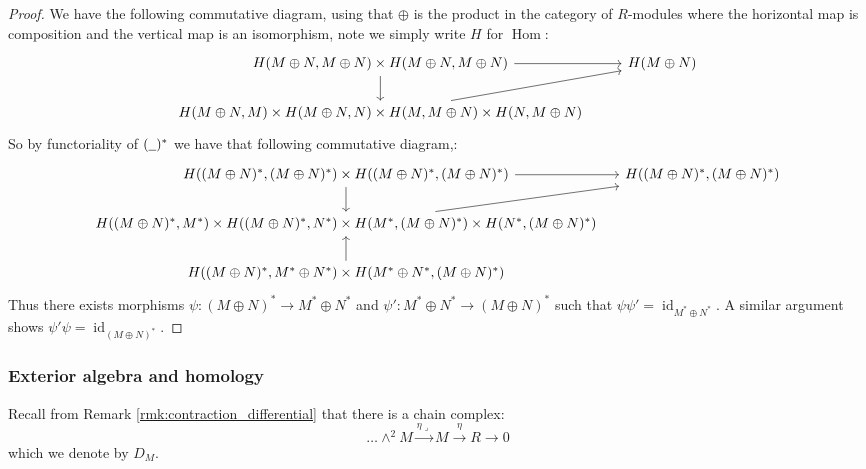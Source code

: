 \documentclass[12pt]{article}
\theoremstyle{plain}
\theoremstyle{definition}
\newcommand{\und}[1]{\underline{\hspace{#1 cm}}}
\newcommand{\lto}{\longrightarrow}
\begin{document}
\begin{proof}
We have the following commutative diagram, using that $\oplus$ is the product in the category of $R$-modules where the horizontal map is composition and the vertical map is an isomorphism, note we simply write $H$ for $\operatorname{Hom}$:
\begin{equation}
\begin{tikzcd}
H(M \oplus N, M \oplus N) \times H(M \oplus N, M \oplus N)\arrow[r]\arrow[d] & H(M \oplus N)\\
H(M \oplus N, M) \times H(M \oplus N, N) \times H(M, M \oplus N) \times H(N, M \oplus N)\arrow[ur]
\end{tikzcd}
\end{equation}
So by functoriality of $(\und{0.2})^\ast$ we have that following commutative diagram,:
\begin{equation}
\begin{tikzcd}[column sep = small]
H((M \oplus N)^\ast, (M \oplus N)^\ast) \times H((M \oplus N)^\ast, (M \oplus N)^\ast)\arrow[r]\arrow[d] & H((M \oplus N)^\ast, (M \oplus N)^\ast)\\
H((M \oplus N)^\ast, M^\ast) \times H((M \oplus N)^\ast, N^\ast) \times H(M^\ast, (M \oplus N)^\ast) \times H(N^\ast,( M \oplus N)^\ast)\arrow[ur]\\
H((M \oplus N)^\ast, M^\ast \oplus N^\ast) \times H(M^\ast \oplus N^\ast, (M \oplus N)^\ast)\arrow[u]
\end{tikzcd}
\end{equation}
Thus there exists morphisms $\psi: (M \oplus N)^\ast \lto M^\ast \oplus N^\ast$ and $\psi': M^\ast \oplus N^\ast \lto (M \oplus N)^\ast$ such that $\psi \psi' = \operatorname{id}_{M^\ast \oplus N^\ast}$. A similar argument shows $\psi'\psi = \operatorname{id}_{(M \oplus N)^\ast}$.
\end{proof}
\subsubsection{Exterior algebra and homology}
Recall from Remark \ref{rmk:contraction_differential} that there is a chain complex:
\begin{equation}
\hdots \wedge^2 M \stackrel{\eta\lrcorner}{\lto} M \stackrel{\eta}{\lto} R \lto 0
\end{equation}
which we denote by $D_M$.
\end{document}
